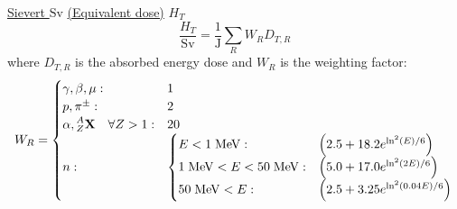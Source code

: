 		\href{https://en.wikipedia.org/wiki/Sievert}{Sievert $\mathrm{Sv}$} \href{https://en.wikipedia.org/wiki/Equivalent_dose}{(Equivalent dose)} $H_T$
		\begin{equation}
			\frac{H_T}{\mathrm{Sv}} = \frac{1}{\mathrm{J}}\sum_R W_R D_{T,R}			
		\end{equation}
		where $D_{T,R}$ is the absorbed energy dose and $W_R$ is the weighting factor:
		\begin{equation}
			\begin{aligned}
				W_R =
				\begin{cases}
					\gamma,\beta,\mu: & 1 \\
					p, \pi^\pm: & 2 \\
					\alpha, \prescript{A}{Z}{\mathbf{X}}\quad\forall Z>1: & 20 \\
					n: &\begin{cases}
						E<1\;\mathrm{MeV}: & \left( 2.5+18.2 e^{\ln^2(E)/6} \right) \\
						1\;\mathrm{MeV} <E<50\;\mathrm{MeV}: & \left( 5.0+17.0 e^{\ln^2(2E)/6} \right) \\
						50\;\mathrm{MeV}<E: & \left( 2.5+3.25 e^{\ln^2(0.04E)/6} \right) \\
					\end{cases}
				\end{cases}\\
			\end{aligned}
		\end{equation}
